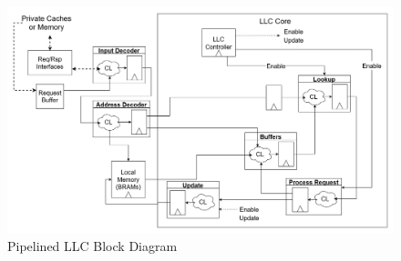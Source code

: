 \documentclass{sig-alternate}
\begin{document}
\begin{figure}[h]
  \centering
  \captionsetup{justification=centering, format=hang}
  \includegraphics[width=1\textwidth]{fig/LLC_RTL_Pipelined_4.png}
  \caption{Pipelined LLC Block Diagram}
  \label{fig:llc_pipelined}
  \end{figure}
\end{document}

